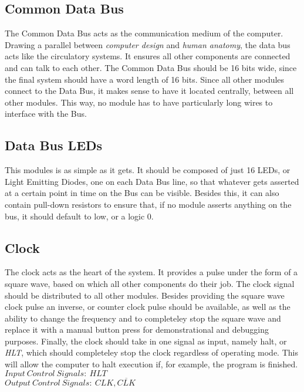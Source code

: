 \subsection{Common Data Bus} \label{common-data-bus}
The Common Data Bus acts as the communication medium of the computer. Drawing a parallel between \emph{computer design}
and \emph{human anatomy}, the data bus acts like the circulatory systems. It ensures all other components are connected
and can talk to each other. The Common Data Bus should be 16 bits wide, since the final system should have a word length of
16 bits. Since all other modules connect to the Data Bus, it makes sense to have it located centrally, between all other modules.
This way, no module has to have particularly long wires to interface with the Bus.

\subsection{Data Bus LEDs} \label{data-bus-leds}
This modules is as simple as it gets. It should be composed of just 16 LEDs, or Light Emitting Diodes, one on each Data Bus line,
so that whatever gets asserted at a certain point in time on the Bus can be visible. Besides this, it can also contain pull-down
resistors to ensure that, if no module asserts anything on the bus, it should default to low, or a logic 0.

\subsection{Clock} \label{clock}
The clock acts as the heart of the system. It provides a pulse under the form of a square wave, based on which all other components
do their job. The clock signal should be distributed to all other modules. Besides providing the square wave clock pulse an inverse,
or counter clock pulse should be available, as well as the ability to change the frequency and to completeley stop the square wave
and replace it with a manual button press for demonstrational and debugging purposes.
Finally, the clock should take in one signal as input, namely halt, or \emph{HLT},
which should completeley stop the clock regardless of operating mode. This will allow the computer to halt execution
if, for example, the program is finished. \\
\textbf{$Input\:Control\:Signals:\:HLT$} \\
\textbf{$Output\:Control\:Signals:\:CLK, \overline{CLK}$}

